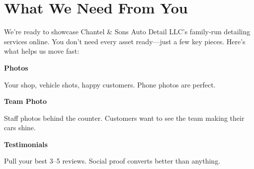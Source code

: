 \documentclass[11pt,letterpaper]{article}
\begin{document}
\vspace{0.2em}

\section*{What We Need From You}

We’re ready to showcase Chantel \& Sons Auto Detail LLC’s family‑run detailing services online. You don’t need every asset ready—just a few key pieces. Here’s what helps us move fast:

\vspace{0.12em}

\noindent\begin{minipage}[t]{0.48\textwidth}
\begin{tcolorbox}[colframe=accent-teal, boxrule=1pt, left=0.7em, right=0.7em, top=0.5em, bottom=0.5em, arc=4pt, boxsep=0pt]
{\bfseries\small\color{accent-teal}Photos}

\vspace{0.15em}

{\small Your shop, vehicle shots, happy customers. Phone photos are perfect.}
\end{tcolorbox}

\vspace{0.1em}

\begin{tcolorbox}[colframe=accent-teal, boxrule=1pt, left=0.7em, right=0.7em, top=0.5em, bottom=0.5em, arc=4pt, boxsep=0pt]
{\bfseries\small\color{accent-teal}Team Photo}

\vspace{0.15em}

{\small Staff photos behind the counter. Customers want to see the team making their cars shine.}
\end{tcolorbox}

\vspace{0.1em}

\begin{tcolorbox}[colframe=accent-teal, boxrule=1pt, left=0.7em, right=0.7em, top=0.5em, bottom=0.5em, arc=4pt, boxsep=0pt]
{\bfseries\small\color{accent-teal}Testimonials}

\vspace{0.15em}

{\small Pull your best 3--5 reviews. Social proof converts better than anything.}
\end{tcolorbox}
\end{minipage}
\hfill
\end{document}
